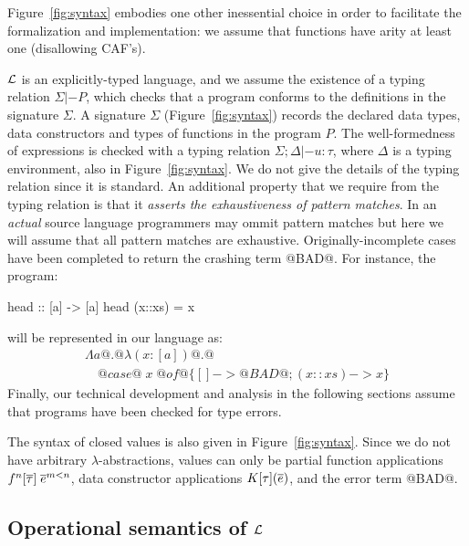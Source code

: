 Figure~\ref{fig:syntax} embodies one other inessential choice in order to 
facilitate the formalization and implementation: we assume that 
functions have arity at least one (disallowing CAF's).  

$\cal L$ is an explicitly-typed language, and we assume the 
existence of a typing relation $\Sigma |- P$, which checks 
that a program conforms to the definitions in the signature $\Sigma$. A signature $\Sigma$ (Figure~\ref{fig:syntax})
records the declared data types, data constructors and types of functions in the program $P$. The 
well-formedness of expressions is checked with a typing relation $\Sigma;\Delta |- u : \tau$, where $\Delta$
is a typing environment, also in Figure~\ref{fig:syntax}.
We do not give the details of the typing relation since it is standard. An additional property that we require 
from the typing relation is that it {\em asserts the exhaustiveness of pattern matches}. In an {\em actual}
source language programmers may ommit pattern matches but here we will assume that all pattern matches 
are exhaustive. Originally-incomplete cases have been completed to return the crashing term @BAD@. For 
instance, the program:
\begin{code}
head :: [a] -> [a]
head (x::xs) = x
\end{code}
will be represented in our language as:
\[\begin{array}{l}
   \Lambda a @.@ \lambda (x{:}[a]) @.@ \\
   \quad @case@\;x\;@of@ \{ [] -> @BAD@ ; (x::xs) -> x \} 
\end{array}\]
Finally, our technical development and analysis in the following sections assume that programs have been 
checked for type errors. 

The syntax of closed values is also given in Figure~\ref{fig:syntax}. Since we do not 
have arbitrary $\lambda$-abstractions, values can only be partial function applications
$f^n[\overline{\tau}]\;\overline{e}^{m < n}$, data constructor applications $K[\tau](\overline{e})$, 
and the error term @BAD@. 

\subsection{Operational semantics of $\cal L$}

